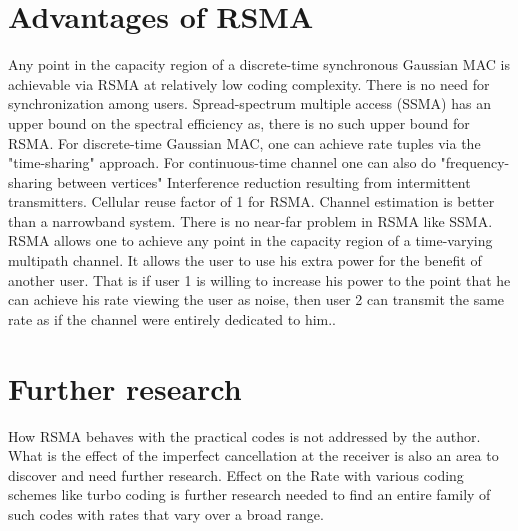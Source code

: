 \documentclass{article}
\begin{document}
 \section{Advantages of RSMA}
Any point in the capacity region of a discrete-time synchronous Gaussian MAC is achievable via RSMA at relatively low coding complexity. There is no need for synchronization among users. Spread-spectrum multiple access (SSMA) has an upper bound on the spectral efficiency as, there is no such upper bound for RSMA. For discrete-time Gaussian MAC, one can achieve rate tuples via the "time-sharing" approach. For continuous-time channel one can also do "frequency-sharing between vertices"
Interference reduction resulting from intermittent transmitters. Cellular reuse factor of 1 for RSMA.
Channel estimation is better than a narrowband system. There is no near-far problem in RSMA like SSMA. RSMA allows one to achieve any point in the capacity region of a time-varying multipath channel. It allows the user to use his extra power for the benefit of another user. That is if user 1 is willing to increase his power to the point that he can achieve his rate viewing the user as noise, then user 2 can transmit the same rate as if the channel were entirely dedicated to him..


\section{Further research}
 How RSMA behaves with the practical codes is not addressed by the author. What is the effect of the imperfect cancellation at the receiver is also an area to discover and need further research. Effect on the Rate with various coding schemes like turbo coding is further research needed to find an entire family of such codes with rates that vary over a broad range.


\end{document}
